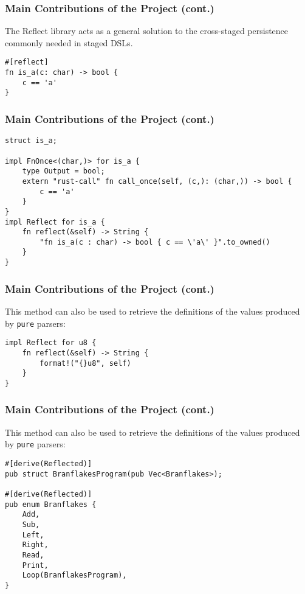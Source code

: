 \documentclass{slides}
\begin{document}
\begin{frame}[fragile]
\frametitle{Main Contributions of the Project (cont.)}

The Reflect library acts as a general solution to the cross-staged persistence commonly needed in staged DSLs.

\begin{verbatim}
#[reflect]
fn is_a(c: char) -> bool {
    c == 'a'
}
\end{verbatim}

\end{frame}

\begin{frame}[fragile]
\frametitle{Main Contributions of the Project (cont.)}

\begin{verbatim}
struct is_a;

impl FnOnce<(char,)> for is_a {
    type Output = bool;
    extern "rust-call" fn call_once(self, (c,): (char,)) -> bool {
        c == 'a'
    }
}
impl Reflect for is_a {
    fn reflect(&self) -> String {
        "fn is_a(c : char) -> bool { c == \'a\' }".to_owned()
    }
}
\end{verbatim}
\end{frame}

\begin{frame}[fragile]
\frametitle{Main Contributions of the Project (cont.)}

This method can also be used to retrieve the definitions of the values produced by \texttt{pure} parsers: 

\begin{verbatim}
impl Reflect for u8 {
    fn reflect(&self) -> String {
        format!("{}u8", self)
    }
}
\end{verbatim}

\end{frame}

\begin{frame}[fragile]
\frametitle{Main Contributions of the Project (cont.)}

This method can also be used to retrieve the definitions of the values produced by \texttt{pure} parsers: 

\begin{verbatim}
#[derive(Reflected)]
pub struct BranflakesProgram(pub Vec<Branflakes>);

#[derive(Reflected)]
pub enum Branflakes {
    Add,
    Sub,
    Left,
    Right,
    Read,
    Print,
    Loop(BranflakesProgram),
}
\end{verbatim}

\end{frame}
\end{document}
